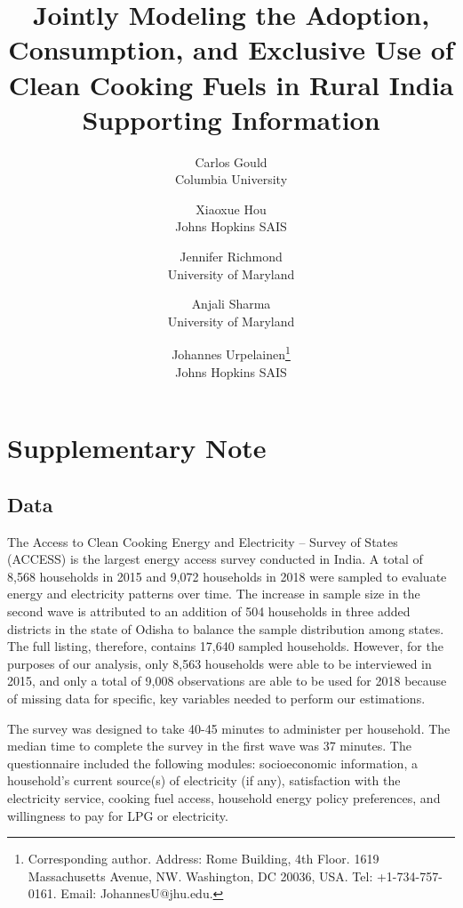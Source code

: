 \documentclass[11pt]{article}
\begin{document}
\title{Jointly Modeling the Adoption, Consumption, and Exclusive Use of Clean Cooking Fuels in Rural India\\\textbf{Supporting Information}}

\author{Carlos Gould\\Columbia University \and Xiaoxue Hou\\Johns Hopkins SAIS \and Jennifer Richmond\\University of Maryland \and Anjali Sharma\\University of Maryland \and Johannes Urpelainen\footnote{Corresponding author. Address: Rome Building, 4th Floor. 1619 Massachusetts Avenue, NW. Washington, DC 20036, USA. Tel: +1-734-757-0161. Email: JohannesU@jhu.edu.}\\Johns Hopkins SAIS}

\maketitle

\tableofcontents

\clearpage

\doublespacing

\section{Supplementary Note}
\label{sect:data}
\subsection{Data}
The Access to Clean Cooking Energy and Electricity -- Survey of States (ACCESS) is the largest energy access survey conducted in India. A total of 8,568 households in 2015 and 9,072 households in 2018 were sampled to evaluate energy and electricity patterns over time. The increase in sample size in the second wave is attributed to an addition of 504 households in three added districts in the state of Odisha to balance the sample distribution among states. The full listing, therefore, contains 17,640 sampled households. However, for the purposes of our analysis, only 8,563 households were able to be interviewed in 2015, and only a total of 9,008 observations are able to be used for 2018 because of missing data for specific, key variables needed to perform our estimations.

The survey was designed to take 40-45 minutes to administer per household. The median time to complete the survey in the first wave was 37 minutes. The questionnaire included the following modules: socioeconomic information, a household's current source(s) of electricity (if any), satisfaction with the electricity service, cooking fuel access, household energy policy preferences, and willingness to pay for LPG or electricity.
\end{document}
